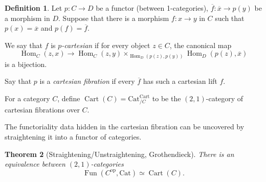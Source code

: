 \documentclass[11pt]{article}
\newtheorem{theorem}{Theorem}[section]
\theoremstyle{definition}
\newtheorem{definition}[theorem]{Definition}
\newcommand{\Cart}{\operatorname{Cart}}
\newcommand{\Cat}{\mathrm{Cat}}
\newcommand{\Fun}{\operatorname{Fun}}
\newcommand{\Hom}{\operatorname{Hom}}
\newcommand{\op}{\mathrm{op}}
\begin{document}
\begin{definition}
    Let $p : C \to D$ be a functor (between 1-categories), $\overline{f} : \overline{x} \to p(y)$ be a morphism in $D$.
    Suppose that there is a morphism $f : x \to y$ in $C$ such that $p(x) = \overline{x}$ and $p(f) = \overline{f}$.

    We say that $f$ is \emph{$p$-cartesian} if for every object $z \in C$, the canonical map
    \[
        \Hom_C(z, x) \to \Hom_C(z, y) \times_{\Hom_D(p(z), p(y))} \Hom_D(p(z), \overline{x})
    \]
    is a bijection.

    Say that $p$ is a \emph{cartesian fibration} if every $\overline{f}$ has such a cartesian lift $f$.
\end{definition}

For a category $C$, define $\Cart(C) = \Cat_{/C}^{\Cart}$ to be the $(2, 1)$-category of cartesian fibrations over $C$.

The functoriality data hidden in the cartesian fibration can be uncovered by straightening it into a functor of categories.
\begin{theorem}[Straightening/Unstraightening, Grothendieck]
    There is an equivalence between $(2, 1)$-categories
    \[
        \Fun(C^{\op}, \Cat) \simeq \Cart(C).
    \]
\end{theorem}
\end{document}
